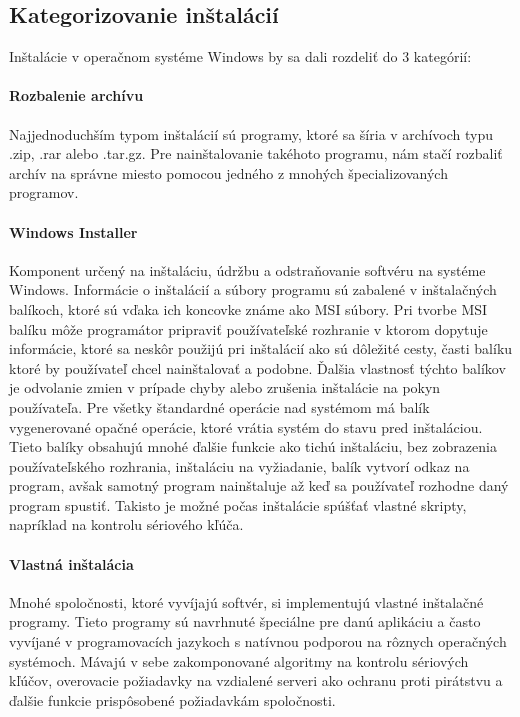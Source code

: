 \subsection{Kategorizovanie inštalácií}
\label{sec:categories}
Inštalácie v operačnom systéme Windows by sa dali rozdeliť do 3 kategórií:

\paragraph{Rozbalenie archívu}
Najjednoduchším typom inštalácií sú programy, ktoré sa šíria v archívoch typu .zip, .rar alebo .tar.gz. Pre nainštalovanie takéhoto programu, nám stačí rozbaliť archív na správne miesto pomocou jedného z mnohých špecializovaných programov.

\paragraph{Windows Installer}
Komponent určený na inštaláciu, údržbu a odstraňovanie softvéru na systéme Windows. Informácie o inštalácií a súbory programu sú zabalené v inštalačných balíkoch, ktoré sú vďaka ich koncovke známe ako MSI súbory. Pri tvorbe MSI balíku môže programátor pripraviť používateľské rozhranie v ktorom dopytuje informácie, ktoré sa neskôr použijú pri inštalácií ako sú dôležité cesty, časti balíku ktoré by používateľ chcel nainštalovať a podobne. Ďalšia vlastnosť týchto balíkov je odvolanie zmien v prípade chyby alebo zrušenia inštalácie na pokyn používateľa. Pre všetky štandardné operácie nad systémom má balík vygenerované opačné operácie, ktoré vrátia systém do stavu pred inštaláciou. Tieto balíky obsahujú mnohé ďalšie funkcie ako tichú inštaláciu, bez zobrazenia používateľského rozhrania, inštaláciu na vyžiadanie, balík vytvorí odkaz na program, avšak samotný program nainštaluje až keď sa používateľ rozhodne daný program spustiť. Takisto je možné počas inštalácie spúšťať vlastné skripty, napríklad na kontrolu sériového kľúča. 

\paragraph{Vlastná inštalácia}
Mnohé spoločnosti, ktoré vyvíjajú softvér, si implementujú vlastné inštalačné programy. Tieto programy sú navrhnuté špeciálne pre danú aplikáciu a často vyvíjané v programovacích jazykoch s natívnou podporou na rôznych operačných systémoch. Mávajú v sebe zakomponované algoritmy na kontrolu sériových kľúčov, overovacie požiadavky na vzdialené serveri ako ochranu proti pirátstvu a ďalšie funkcie prispôsobené požiadavkám spoločnosti.

